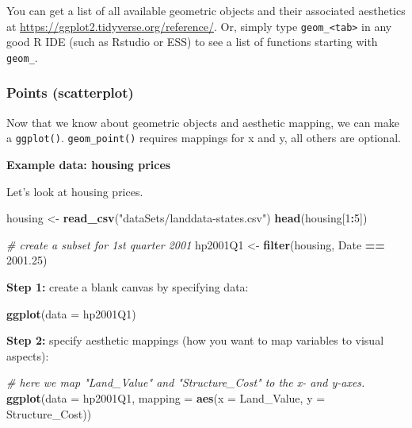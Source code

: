 \documentclass[]{book}
\newenvironment{Shaded}{\begin{snugshade}}{\end{snugshade}}
\newcommand{\KeywordTok}[1]{\textcolor[rgb]{0.13,0.29,0.53}{\textbf{#1}}}
\newcommand{\DataTypeTok}[1]{\textcolor[rgb]{0.13,0.29,0.53}{#1}}
\newcommand{\DecValTok}[1]{\textcolor[rgb]{0.00,0.00,0.81}{#1}}
\newcommand{\FloatTok}[1]{\textcolor[rgb]{0.00,0.00,0.81}{#1}}
\newcommand{\StringTok}[1]{\textcolor[rgb]{0.31,0.60,0.02}{#1}}
\newcommand{\CommentTok}[1]{\textcolor[rgb]{0.56,0.35,0.01}{\textit{#1}}}
\newcommand{\OperatorTok}[1]{\textcolor[rgb]{0.81,0.36,0.00}{\textbf{#1}}}
\newcommand{\NormalTok}[1]{#1}
\begin{document}
You can get a list of all available geometric objects and their
associated aesthetics at \url{https://ggplot2.tidyverse.org/reference/}.
Or, simply type \texttt{geom\_\textless{}tab\textgreater{}} in any good
R IDE (such as Rstudio or ESS) to see a list of functions starting with
\texttt{geom\_}.

\subsubsection{Points (scatterplot)}\label{points-scatterplot}

Now that we know about geometric objects and aesthetic mapping, we can
make a \texttt{ggplot()}. \texttt{geom\_point()} requires mappings for x
and y, all others are optional.

\textbf{Example data: housing prices}

Let's look at housing prices.

\begin{Shaded}
\begin{Highlighting}[]
\NormalTok{housing <-}\StringTok{ }\KeywordTok{read_csv}\NormalTok{(}\StringTok{"dataSets/landdata-states.csv"}\NormalTok{)}
\KeywordTok{head}\NormalTok{(housing[}\DecValTok{1}\OperatorTok{:}\DecValTok{5}\NormalTok{])}

\CommentTok{# create a subset for 1st quarter 2001}
\NormalTok{hp2001Q1 <-}\StringTok{ }\KeywordTok{filter}\NormalTok{(housing, Date }\OperatorTok{==}\StringTok{ }\FloatTok{2001.25}\NormalTok{)}
\end{Highlighting}
\end{Shaded}

\textbf{Step 1:} create a blank canvas by specifying data:

\begin{Shaded}
\begin{Highlighting}[]
\KeywordTok{ggplot}\NormalTok{(}\DataTypeTok{data =}\NormalTok{ hp2001Q1)}
\end{Highlighting}
\end{Shaded}

\textbf{Step 2:} specify aesthetic mappings (how you want to map
variables to visual aspects):

\begin{Shaded}
\begin{Highlighting}[]
\CommentTok{# here we map "Land_Value" and "Structure_Cost" to the x- and y-axes.}
\KeywordTok{ggplot}\NormalTok{(}\DataTypeTok{data =}\NormalTok{ hp2001Q1, }\DataTypeTok{mapping =} \KeywordTok{aes}\NormalTok{(}\DataTypeTok{x =}\NormalTok{ Land_Value, }\DataTypeTok{y =}\NormalTok{ Structure_Cost))}
\end{Highlighting}
\end{Shaded}
\end{document}
